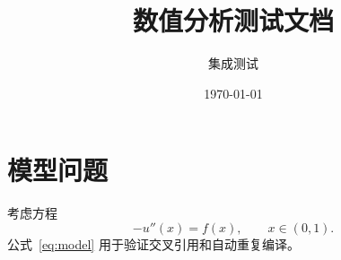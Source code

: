 \documentclass{ctexart}
\title{数值分析测试文档}
\author{集成测试}
\date{\today}
\begin{document}
\maketitle
\tableofcontents



\section{模型问题}
考虑方程
\begin{equation}
  -u''(x) = f(x), \qquad x \in (0,1).
  \label{eq:model}
\end{equation}
公式~\eqref{eq:model} 用于验证交叉引用和自动重复编译。
\end{document}
